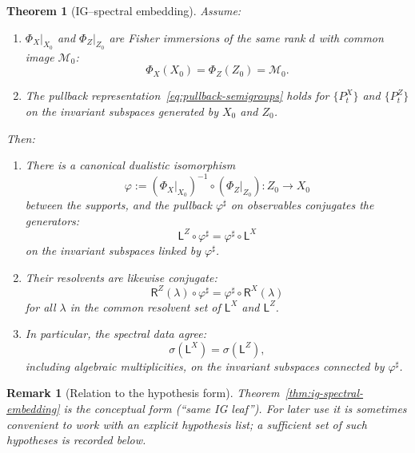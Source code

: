 \documentclass[11pt]{article}
\newtheorem{theorem}{Theorem}
\newtheorem{remark}{Remark}
\newcommand{\Mcal}{\mathcal{M}}
\newcommand{\Lsf}{\mathsf{L}}
\newcommand{\Rsf}{\mathsf{R}}
\begin{document}
\begin{theorem}[IG--spectral embedding]
Assume:
\begin{enumerate}[label=(S\arabic*),leftmargin=1.8em]
  \item $\Phi_X|_{X_0}$ and $\Phi_Z|_{Z_0}$ are Fisher immersions of the
  same rank $d$ with common image $\Mcal_0$:
  \[
    \Phi_X(X_0) = \Phi_Z(Z_0) = \Mcal_0.
  \]
  \item The pullback representation~\eqref{eq:pullback-semigroups} holds
  for $\{P_t^X\}$ and $\{P_t^Z\}$ on the invariant subspaces generated by
  $X_0$ and $Z_0$.
\end{enumerate}
Then:
\begin{enumerate}[label=(\alph*),leftmargin=1.8em]
  \item There is a canonical dualistic isomorphism
  \[
    \varphi
    := (\Phi_X|_{X_0})^{-1}\circ (\Phi_Z|_{Z_0})
    : Z_0 \to X_0
  \]
  between the supports, and the pullback
  $\varphi^\sharp$ on observables conjugates the generators:
  \[
    \Lsf^Z \circ \varphi^\sharp
    = \varphi^\sharp \circ \Lsf^X
  \]
  on the invariant subspaces linked by $\varphi^\sharp$.
  \item Their resolvents are likewise conjugate:
  \[
    \Rsf^Z(\lambda)\circ \varphi^\sharp
    = \varphi^\sharp \circ \Rsf^X(\lambda)
  \]
  for all $\lambda$ in the common resolvent set of $\Lsf^X$ and $\Lsf^Z$.
  \item In particular, the spectral data agree:
  \[
    \sigma(\Lsf^X) = \sigma(\Lsf^Z),
  \]
  including algebraic multiplicities, on the invariant subspaces
  connected by $\varphi^\sharp$.
\end{enumerate}
\end{theorem}

\begin{remark}[Relation to the hypothesis form]
Theorem~\ref{thm:ig-spectral-embedding} is the conceptual form (``same IG leaf'').
For later use it is sometimes convenient to work with an explicit hypothesis list; a sufficient set of such hypotheses is recorded below.
\end{remark}
\end{document}
